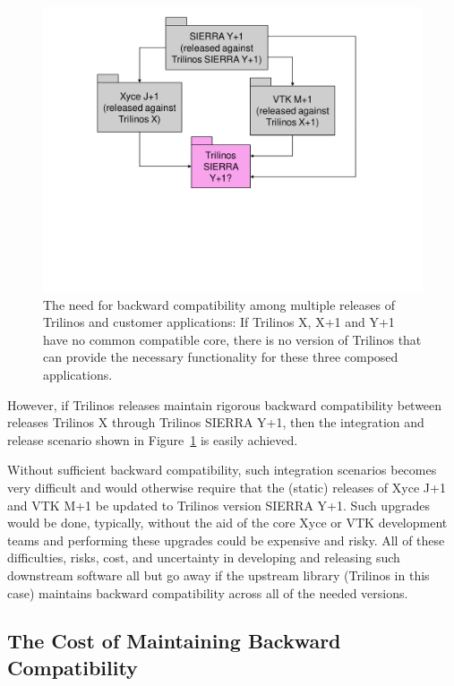\documentclass[11pt]{SANDreport}
\begin{document}
\begin{figure}
\begin{center}
\includegraphics[trim = 1.0in 2.7in 1.0in 0.2in, scale=0.55]
{XyceSierraVtkTrilinosCompatibility}
\caption{
The need for backward compatibility among
multiple releases of Trilinos and customer applications: If Trilinos X, X+1 and Y+1 have no common compatible core, there is no version of Trilinos that can provide the necessary functionality for these three composed applications.}
\label{fig:XyceSierraVtkTrilinosCompatibility}
\end{center}
\end{figure}

However, if Trilinos releases maintain rigorous backward compatibility
between releases Trilinos X through Trilinos SIERRA Y+1, then the
integration and release scenario shown in
Figure~\ref{fig:XyceSierraVtkTrilinosCompatibility} is easily
achieved.

Without sufficient backward compatibility, such integration scenarios
becomes very difficult and would otherwise require that the (static)
releases of Xyce J+1 and VTK M+1 be updated to Trilinos version SIERRA
Y+1.  Such upgrades would be done, typically, without the aid of the
core Xyce or VTK development teams and performing these upgrades could
be expensive and risky.  All of these difficulties, risks, cost, and
uncertainty in developing and releasing such downstream software all
but go away if the upstream library (Trilinos in this case) maintains
backward compatibility across all of the needed versions.


%
{}\subsection{The Cost of Maintaining Backward Compatibility}
\label{sec:costs_of_back_compat}
%
\end{document}
